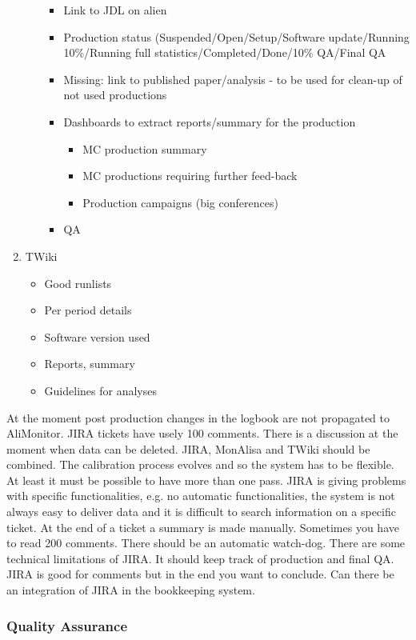 \begin{enumerate}
\begin{itemize}
\begin{itemize}
      \item Link to JDL on alien
      \item Production status (Suspended/Open/Setup/Software update/Running 10\%/Running full statistics/Completed/Done/10\% QA/Final QA
      \item Missing: link to published paper/analysis - to be used for clean-up of not used productions
      \item Dashboards to extract reports/summary for the production
      \begin{itemize}
        \item MC production summary
        \item MC productions requiring further feed-back
        \item Production campaigns (big conferences)
      \end{itemize}
      \item QA
    \end{itemize}
  \end{itemize}
  \item TWiki
    \begin{itemize}
      \item Good runlists
      \item Per period details
      \item Software version used
      \item Reports, summary
      \item Guidelines for analyses
    \end{itemize}
\end{enumerate}
At the moment post production changes in the logbook are not propagated to AliMonitor. JIRA tickets have usely 100 comments. There is a discussion at the moment when data can be deleted. JIRA, MonAlisa and TWiki should be combined. The calibration process evolves and so the system has to be flexible. At least it must be possible to have more than one pass. JIRA is giving problems with specific functionalities, e.g. no automatic functionalities, the system is not always easy to deliver data and it is difficult to search information on a specific ticket. At the end of a ticket a summary is made manually. Sometimes you have to read 200 comments. There should be an automatic watch-dog. There are some technical limitations of JIRA. It should keep track of production and final QA. JIRA is good for comments but in the end you want to conclude. Can there be an integration of JIRA in the bookkeeping system.

\subsubsection{Quality Assurance}


